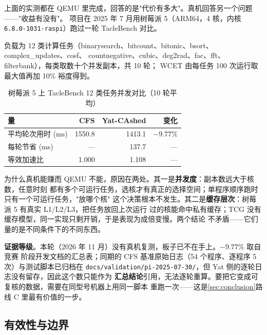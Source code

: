 上面的实测都在 QEMU 里完成，回答的是"代价有多大"。真机回答另一个问题——"收益有没有"。
项目在 2025 年 7 月用树莓派 5（ARM64，4 核，内核 \texttt{6.8.0-1031-raspi}）跑过一轮
TacleBench 对比。

负载为 12 类计算任务（binarysearch、bitcount、bitonic、bsort、complex\_updates、cosf、
countnegative、cubic、deg2rad、fac、fft、filterbank），每类取数十个并发副本，共 10 轮；
WCET 由每任务 100 次运行取最大值再加 10\% 裕度得到。

\begin{table}[H]
\centering
\caption{树莓派 5 上 TacleBench 12 类任务并发对比（10 轮平均）}
\label{tab:pi}
\begin{tabular}{lrrr}
\toprule
量 & CFS & Yat-CAshed & 变化 \\
\midrule
平均轮次用时 (ms) & 1550.8 & 1413.1 & $-9.77\%$ \\
每轮节省 (ms) & --- & 137.7 & --- \\
等效加速比 & 1.000 & 1.108 & --- \\
\bottomrule
\end{tabular}
\end{table}

为什么真机能赚而 QEMU 不能，原因在两处。其一是\textbf{并发度}：副本数远大于核数，任意时刻
都有多个可运行任务，选核才有真正的选择空间；单程序顺序跑时只有一个可运行任务，"放哪个核"
这个决策根本不发生。其二是\textbf{缓存层次}：树莓派 5 有真实 L1/L2/L3，把任务放回上次运行
过的核能命中私有缓存；TCG 没有缓存模型，同一实现只剩开销，于是表现为成倍变慢。两个结论
不矛盾——它们量的是不同条件下的不同东西。

\textbf{证据等级}。本轮（2026 年 11 月）没有真机复测，板子已不在手上。$-9.77\%$ 取自竞赛
阶段开发文档的汇总表；同期的 CFS 基准原始日志（54 个程序、逐程序 5 次）与测试脚本已归档在
\texttt{docs/validation/pi-2025-07-30/}，但 Yat 侧的逐轮日志没有留存，因此这个数只能作为
\textbf{汇总结论}引用，无法逐轮重算。要把它变成可复核的数据，需要在同型号机器上用同一脚本
重跑一次——这是\autoref{sec:conclusion}路线 C 里最有价值的一步。

\subsection{有效性与边界}

